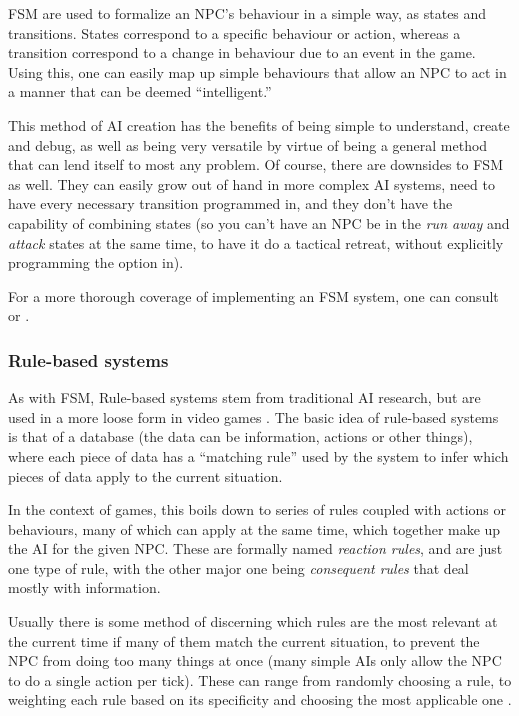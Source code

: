 FSM are used to formalize an NPC's behaviour in a simple way, as states and
transitions. States correspond to a specific behaviour or action, whereas a
transition correspond to a change in behaviour due to an event in the
game. Using this, one can easily map up simple behaviours that allow an NPC to
act in a manner that can be deemed ``intelligent.''

This method of AI creation has the benefits of being simple to understand,
create and debug, as well as being very versatile by virtue of being a general
method that can lend itself to most any problem. Of course, there are downsides
to FSM as well. They can easily grow out of hand in more complex AI systems,
need to have every necessary transition programmed in, and they don't have the
capability of combining states (so you can't have an NPC be in the \emph{run
  away} and \emph{attack} states at the same time, to have it do a tactical
retreat, without explicitly programming the option in).

For a more thorough coverage of implementing an FSM system, one can consult
\citet{rabin2002implementing} or \citet[][chap.~3]{kirby2011introduction}.

\subsubsection{Rule-based systems}
\label{sec:rule-based-systems}

As with FSM, Rule-based systems stem from traditional AI research, but are used
in a more loose form in video games \citep{christian2002simple}. The basic idea
of rule-based systems is that of a database (the data can be information,
actions or other things), where each piece of data has a ``matching rule'' used
by the system to infer which pieces of data apply to the current situation.

In the context of games, this boils down to series of rules coupled with actions
or behaviours, many of which can apply at the same time, which together make up
the AI for the given NPC. These are formally named \emph{reaction rules}, and
are just one type of rule, with the other major one being \emph{consequent
  rules} that deal mostly with information.

Usually there is some method of discerning which rules are the most relevant at
the current time if many of them match the current situation, to prevent the NPC
from doing too many things at once (many simple AIs only allow the NPC to do a
single action per tick). These can range from randomly choosing a rule, to
weighting each rule based on its specificity and choosing the most applicable
one \citep{Freeman-Hargis}.

